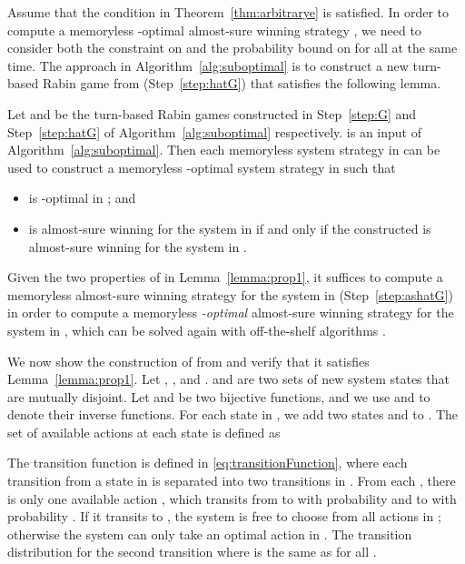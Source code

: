 \documentclass[runningheads,a4paper]{llncs}
\begin{document}
Assume that the condition in Theorem~\ref{thm:arbitrarye} is satisfied. In order to compute a memoryless -optimal almost-sure winning strategy , we need to consider both the constraint on  and the probability bound on  for all  at the same time. 
The approach in Algorithm~\ref{alg:suboptimal} is to construct a new turn-based Rabin game  from  (Step~\ref{step:hatG}) that satisfies the following lemma. 






\begin{lemma}
Let  and  be the turn-based Rabin games constructed in Step~\ref{step:G} and Step~\ref{step:hatG} of Algorithm~\ref{alg:suboptimal} respectively.  is an input of Algorithm~\ref{alg:suboptimal}. 
Then each memoryless system strategy  in  can be used to construct a memoryless -optimal system strategy  in  such that
\begin{itemize}
\item  is -optimal in ; and
\item  is almost-sure winning for the system in  if and only if the constructed  is almost-sure winning for the system in . 
\end{itemize}
\label{lemma:prop1}
\end{lemma}








Given the two properties of  in Lemma~\ref{lemma:prop1}, 
it suffices to compute a memoryless almost-sure winning strategy for the system in  (Step~\ref{step:ashatG}) in order to compute a memoryless \emph{-optimal} almost-sure winning strategy for the system in , which can be solved again with off-the-shelf algorithms \cite{chatterjee2005complexity, chatterjee2006strategy}. 




We now show the construction of  from  and verify that it satisfies Lemma~\ref{lemma:prop1}. 
Let , , and .  and  are two sets of new system states that are mutually disjoint. Let  and  be two bijective functions, and we use  and  to denote their inverse functions. For each state  in , we add two states  and  to . 
The set of available actions at each state  is defined as

The transition function  is defined  in \eqref{eq:transitionFunction}, where each transition from a state  in  is separated into two transitions in . From each , there is only one available action , which transits from  to  with probability  and to  with probability . If it transits to , the system is free to choose from all actions in ; otherwise the system can only take an optimal action in . The transition distribution  for the second transition where  is the same as  for all . 
\end{document}
